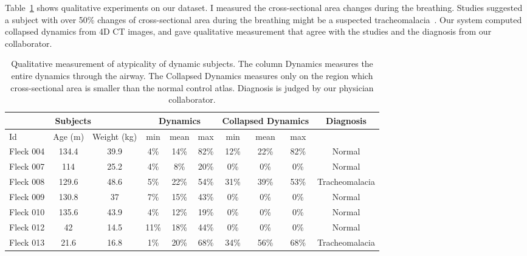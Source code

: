 Table~\ref{tab:Fleck} shows qualitative experiments on our dataset.
I measured the cross-sectional area changes during the breathing.
Studies suggested a subject with over 50\% changes of cross-sectional area during the breathing might be a suspected tracheomalacia~\cite{chung2011ct, boiselle2009tracheal, hasegawa2003tracheomalacia}. 
Our system computed collapsed dynamics from 4D CT images, and gave qualitative measurement that agree with the studies and the diagnosis from our collaborator.
\begin{table}
  \centering
  \begin{tabular}{|lcc|c|c|c|c|c|c|c|}
  \hline
  \multicolumn{3}{|c|}{Subjects} & \multicolumn{3}{|c|}{Dynamics} & \multicolumn{3}{|c|}{Collapsed Dynamics} & Diagnosis \\
  \hline
  Id  & Age (m) & Weight (kg) & min & mean & max  & min & mean & max &\\
  \hline
  Fleck 004 & 134.4  & 39.9   & 4\% & 14\% & 82\% & 12\%& 22\%& 82\% & Normal \\
  Fleck 007 & 114 & 25.2      & 4\% & 8\%  & 20\% & 0\% & 0\% & 0\% &  Normal \\
  Fleck 008 & 129.6   & 48.6  & 5\% & 22\% & 54\% & 31\%&39\% &53\% & Tracheomalacia \\
  Fleck 009 & 130.8   & 37    & 7\% & 15\% & 43\% & 0\% & 0\% & 0\% &Normal \\
  Fleck 010 & 135.6   & 43.9  & 4\% & 12\% & 19\% & 0\% & 0\% & 0\% & Normal \\
  Fleck 012 &  42     & 14.5  & 11\% & 18\% & 44\% & 0\% & 0\% & 0\% &Normal \\
  Fleck 013 &  21.6   & 16.8  & 1\% & 20\% & 68\% & 34\% & 56\% & 68\% & Tracheomalacia \\
  \hline
  \end{tabular}
  \caption{Qualitative measurement of atypicality of dynamic subjects. The column Dynamics measures the entire dynamics through the airway. The Collapsed Dynamics measures only on the region which cross-sectional area is smaller than the normal control atlas.
  Diagnosis is judged by our physician collaborator.
   }
  \label{tab:Fleck}
\end{table}




